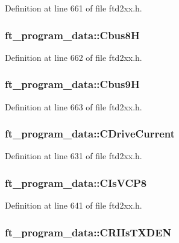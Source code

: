 Definition at line 661 of file ftd2xx.h.\hypertarget{structft__program__data_aafd97398ad5b8ac453ded17e2b777938}{
\subsubsection[{Cbus8H}]{ {\bf ft\_\-program\_\-data::Cbus8H}}}
\label{structft__program__data_aafd97398ad5b8ac453ded17e2b777938}


Definition at line 662 of file ftd2xx.h.\hypertarget{structft__program__data_a707c521299114d1d4903d6286b6b07e8}{
\subsubsection[{Cbus9H}]{ {\bf ft\_\-program\_\-data::Cbus9H}}}
\label{structft__program__data_a707c521299114d1d4903d6286b6b07e8}


Definition at line 663 of file ftd2xx.h.\hypertarget{structft__program__data_a5128f7c002f6dad43f6f76895de512b3}{
\subsubsection[{CDriveCurrent}]{ {\bf ft\_\-program\_\-data::CDriveCurrent}}}
\label{structft__program__data_a5128f7c002f6dad43f6f76895de512b3}


Definition at line 631 of file ftd2xx.h.\hypertarget{structft__program__data_ae07ed81a5c26a3288d28e6a77ed3a76a}{
\subsubsection[{CIsVCP8}]{ {\bf ft\_\-program\_\-data::CIsVCP8}}}
\label{structft__program__data_ae07ed81a5c26a3288d28e6a77ed3a76a}


Definition at line 641 of file ftd2xx.h.\hypertarget{structft__program__data_a5bb9db57af04d2f404272c8e6c2a59f6}{
\subsubsection[{CRIIsTXDEN}]{ {\bf ft\_\-program\_\-data::CRIIsTXDEN}}}
\label{structft__program__data_a5bb9db57af04d2f404272c8e6c2a59f6}


